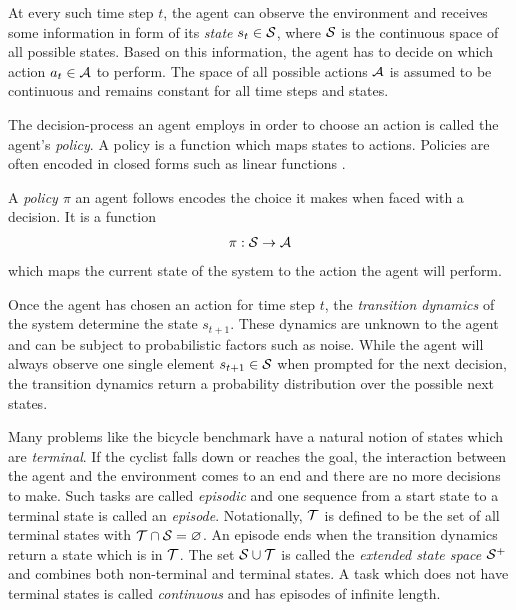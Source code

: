 At every such time step $t$, the agent can observe the environment and receives some information in form of its \emph{state} $s_t \in \mathcal{S}$, where $\mathcal{S}$ is the continuous space of all possible states.
Based on this information, the agent has to decide on which action $a_t \in \mathcal{A}$ to perform.
The space of all possible actions $\mathcal{A}$ is assumed to be continuous and remains constant for all time steps and states.

The decision-process an agent employs in order to choose an action is called the agent's \emph{policy}.
A policy is a function which maps states to actions.
Policies are often encoded in closed forms such as linear functions \cite{deisenroth_efficient_2010}.
\begin{definition}[Policy]
    A \emph{policy $\pi$} an agent follows encodes the choice it makes when faced with a decision.
    It is a function
    \begin{align}
        \pi : \Es \to \Ah
    \end{align}
    which maps the current state of the system to the action the agent will perform.
\end{definition}

Once the agent has chosen an action for time step $t$, the \emph{transition dynamics} of the system determine the state $s_{t+1}$.
These dynamics are unknown to the agent and can be subject to probabilistic factors such as noise.
While the agent will always observe one single element $s_{t+1} \in \mathcal{S}$ when prompted for the next decision, the transition dynamics return a probability distribution over the possible next states.

Many problems like the bicycle benchmark have a natural notion of states which are \emph{terminal}.
If the cyclist falls down or reaches the goal, the interaction between the agent and the environment comes to an end and there are no more decisions to make.
Such tasks are called \emph{episodic} and one sequence from a start state to a terminal state is called an \emph{episode}.
Notationally, $\mathcal{T}$ is defined to be the set of all terminal states with $\mathcal{T} \cap \mathcal{S} = \varnothing$.
An episode ends when the transition dynamics return a state which is in $\mathcal{T}$.
The set $\mathcal{S} \cup \mathcal{T}$ is called the \emph{extended state space $\mathcal{S}^+$} and combines both non-terminal and terminal states.
A task which does not have terminal states is called \emph{continuous} and has episodes of infinite length.

